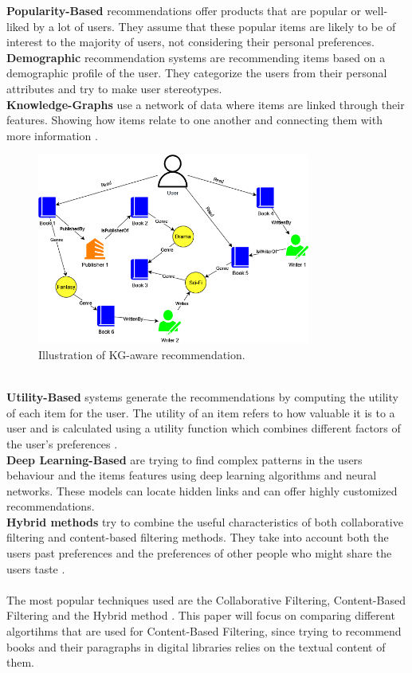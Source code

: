 \documentclass{llncs}
\begin{document}
\textbf{Popularity-Based} recommendations offer products that are popular or well-liked by a lot of users. They assume that these popular items are likely to be of interest to the majority of users, not considering their personal preferences.\\
\textbf{Demographic} recommendation systems are recommending items based on a demographic profile of the user. They categorize the users from their personal attributes and try to make user stereotypes.\\
\textbf{Knowledge-Graphs} use a network of data where items are linked through their features. Showing how items relate to one another and connecting them with more information \cite{Imene2022488}.
\begin{figure}
\centering
\includegraphics[width=0.8\textwidth]{img/knowledge_graph_example.png}
\caption{Illustration of KG-aware recommendation.} \label{fig:knowledge_graph_example}
\end{figure}\\
\textbf{Utility-Based} systems generate the recommendations by computing the utility of each item for the user. The utility of an item refers to how valuable it is to a user and is calculated using a utility function which combines different factors of the user's preferences \cite{Burke2002331}.\\
\textbf{Deep Learning-Based} are trying to find complex patterns in the users behaviour and the items features using deep learning algorithms and neural networks. These models can locate hidden links and can offer highly customized recommendations.\\
\textbf{Hybrid methods} try to combine the useful characteristics of both collaborative filtering and content-based filtering methods. They take into account both the users past preferences and the preferences of other people who might share the users taste \cite{melville:aaai02}. \\\\
%
The most popular techniques used are the Collaborative Filtering, Content-Based Filtering and the Hybrid method \cite{pub.1072601078}. This paper will focus on comparing different algortihms that are used for Content-Based Filtering, since trying to recommend books and their paragraphs in digital libraries relies on the textual content of them.
\end{document}
